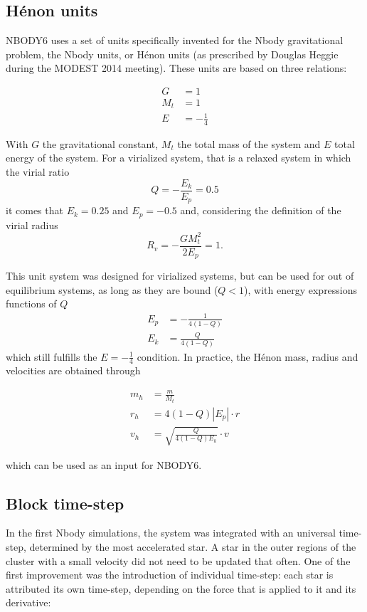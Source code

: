 \subsection{H\'enon units}

NBODY6 uses a set of units specifically invented for the Nbody gravitational problem, the Nbody units, or H\'enon units (as prescribed by Douglas Heggie during the MODEST 2014 meeting). These units are based on three relations:

\begin{align}
G &= 1\\
M_t &= 1\\
E &= -\frac{1}{4}
\end{align}

With $G$ the gravitational constant, $M_t$ the total mass of the system and $E$ total energy of the system. For a virialized system, that is a relaxed system in which the virial ratio 
\begin{equation}
Q = - \frac{E_k}{E_p} = 0.5
\end{equation}
it comes that $E_k=0.25$ and $E_p = -0.5$ and, considering the definition of the virial radius 
\begin{equation}
R_v = - \frac{G M_t^2}{2 E_p} = 1.
\end{equation} 

This unit system was designed for virialized systems, but can be used for out of equilibrium systems, as long as they are bound ($Q <1$), with energy expressions functions of $Q$
\begin{align}
E_p  &= - \frac{1}{4(1-Q)}\\
E_k &= \frac{Q}{4(1-Q)}
\end{align}
which still fulfills the $E = -\frac{1}{4}$ condition. In practice, the H\'enon mass, radius and velocities are obtained through

\begin{align}
m_h &= \frac{m}{M_t}\\
r_h &= 4 (1-Q) |E_p| \cdot r\\
v_h &= \sqrt{ \frac{Q}{4(1-Q) E_k} } \cdot v
\end{align}

which can be used as an input for NBODY6.
\subsection{Block time-step}
 
In the first Nbody simulations, the system was integrated with an universal time-step, determined by the most accelerated star. A star in the outer regions of the cluster with a small velocity did not need to be updated that often. One of the first improvement  was the introduction of individual time-step: each star is attributed its own time-step, depending on the force that is applied to it and its derivative:


